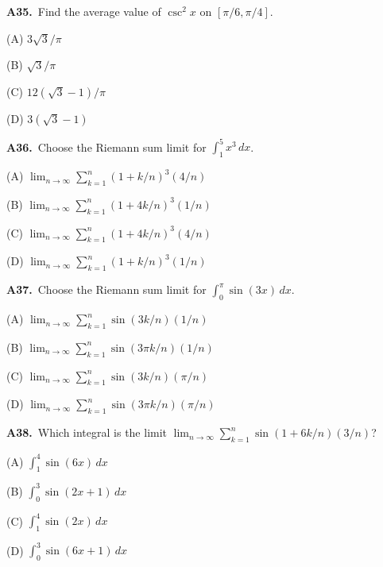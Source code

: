 \documentclass[11pt]{article}
\begin{document}
\bigskip\noindent\textbf{A35.}\ Find the average value of $\csc^2x$ on $[\pi/6,\pi/4]$.
\begin{list}{}{\setlength{\leftmargin}{3em}\setlength{\labelwidth}{2.5em}\setlength{\itemsep}{0pt}\setlength{\topsep}{2pt}}
\item[(A)] $3\sqrt3/\pi$
\item[(B)] $\sqrt3/\pi$
\item[(C)] $12(\sqrt3-1)/\pi$
\item[(D)] $3(\sqrt3-1)$
\end{list}

\bigskip\noindent\textbf{A36.}\ Choose the Riemann sum limit for $\int_1^5x^3\,dx$.
\begin{list}{}{\setlength{\leftmargin}{3em}\setlength{\labelwidth}{2.5em}\setlength{\itemsep}{0pt}\setlength{\topsep}{2pt}}
\item[(A)] $\lim_{n\to\infty}\sum_{k=1}^n(1+k/n)^3(4/n)$
\item[(B)] $\lim_{n\to\infty}\sum_{k=1}^n(1+4k/n)^3(1/n)$
\item[(C)] $\lim_{n\to\infty}\sum_{k=1}^n(1+4k/n)^3(4/n)$
\item[(D)] $\lim_{n\to\infty}\sum_{k=1}^n(1+k/n)^3(1/n)$
\end{list}

\bigskip\noindent\textbf{A37.}\ Choose the Riemann sum limit for $\int_0^\pi\sin(3x)\,dx$.
\begin{list}{}{\setlength{\leftmargin}{3em}\setlength{\labelwidth}{2.5em}\setlength{\itemsep}{0pt}\setlength{\topsep}{2pt}}
\item[(A)] $\lim_{n\to\infty}\sum_{k=1}^n\sin(3k/n)(1/n)$
\item[(B)] $\lim_{n\to\infty}\sum_{k=1}^n\sin(3\pi k/n)(1/n)$
\item[(C)] $\lim_{n\to\infty}\sum_{k=1}^n\sin(3k/n)(\pi/n)$
\item[(D)] $\lim_{n\to\infty}\sum_{k=1}^n\sin(3\pi k/n)(\pi/n)$
\end{list}

\bigskip\noindent\textbf{A38.}\ Which integral is the limit $\lim_{n\to\infty}\sum_{k=1}^n\sin(1+6k/n)(3/n)$?
\begin{list}{}{\setlength{\leftmargin}{3em}\setlength{\labelwidth}{2.5em}\setlength{\itemsep}{0pt}\setlength{\topsep}{2pt}}
\item[(A)] $\int_1^4\sin(6x)\,dx$
\item[(B)] $\int_0^3\sin(2x+1)\,dx$
\item[(C)] $\int_1^4\sin(2x)\,dx$
\item[(D)] $\int_0^3\sin(6x+1)\,dx$
\end{list}
\end{document}
